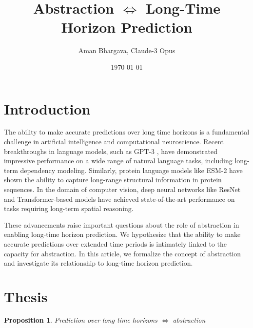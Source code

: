 \documentclass[12pt]{article}
\title{Abstraction $\iff$ Long-Time Horizon Prediction}
\author{Aman Bhargava, Claude-3 Opus}
\date{\today}
\newtheorem{proposition}{Proposition}
\begin{document}
\maketitle

\section{Introduction}
The ability to make accurate predictions over long time horizons is a fundamental challenge in artificial intelligence and computational neuroscience. Recent breakthroughs in language models, such as GPT-3 \cite{brown2020language}, have demonstrated impressive performance on a wide range of natural language tasks, including long-term dependency modeling. Similarly, protein language models like ESM-2 \cite{lin2022evolutionary} have shown the ability to capture long-range structural information in protein sequences. In the domain of computer vision, deep neural networks like ResNet \cite{he2016deep} and Transformer-based models \cite{dosovitskiy2020image} have achieved state-of-the-art performance on tasks requiring long-term spatial reasoning.

These advancements raise important questions about the role of abstraction in enabling long-time horizon prediction. We hypothesize that the ability to make accurate predictions over extended time periods is intimately linked to the capacity for abstraction. In this article, we formalize the concept of abstraction and investigate its relationship to long-time horizon prediction.

\section{Thesis}
\begin{proposition}
Prediction over long time horizons $\iff$ abstraction
\end{proposition}
\end{document}
